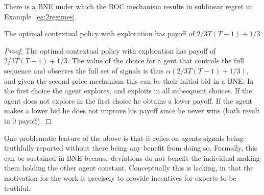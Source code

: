 \begin{prop}
There is a BNE  under which the BOC mechanism results in sublinear regret in Example~\ref{eg:2regimes}. 
\end{prop}

The optimal contextual policy with exploration has payoff of $2/3T(T-1) + 1/3$

\begin{proof}
The optimal contextual policy with exploration has payoff of $2/3T(T-1) + 1/3$. The value of the choice for a gent that controls the full sequence and observes the full set of signals is thus $\alpha (2/3T(T-1) + 1/3)$, and given the second price mechanism this can be their initial bid in a BNE. In the first choice the agent explores, and exploits in all subsequent choices. If the agent does not explore in the first choice he obtains a lower payoff. If the agent makes a lower bid he does not improve his payoff since he never wins (both result in 0 payoff).
\end{proof}


One problematic feature of the above is that it relies on agents signals being truthfully reported without there being any benefit from doing so. Formally, this can be sustained in BNE because deviations do not benefit the individual making them holding the other agent constant. Conceptually this is lacking, in that the motivation for the work is precisely to provide incentives for experts to be truthful.










